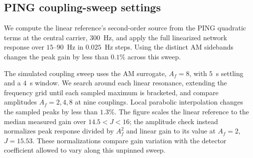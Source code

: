 \subsection{PING coupling-sweep settings}\label{supp:ping-runs}
We compute the linear reference's
second-order source from the PING quadratic terms at the central carrier,
$300$~Hz, and apply the full linearized network response over $15$--$90$~Hz
in $0.025$~Hz steps. Using the distinct AM sidebands changes the peak gain by
less than $0.1\%$ across this sweep.

The simulated coupling sweep uses the AM surrogate, $A_f=8$, with $5$~s
settling and a $4$~s window. We search around each linear resonance, extending
the frequency grid until each sampled maximum is bracketed, and compare
amplitudes $A_f=2,4,8$ at nine couplings. Local parabolic interpolation changes
the sampled peaks by less than $1.3\%$. The figure scales the linear reference
to the median measured gain over $14.5<J<16$; the amplitude check instead
normalizes peak response divided by $A_f^2$ and linear gain to its value at
$A_f=2$, $J=15.53$. These normalizations compare gain variation with the detector coefficient
allowed to vary along this unpinned sweep.

